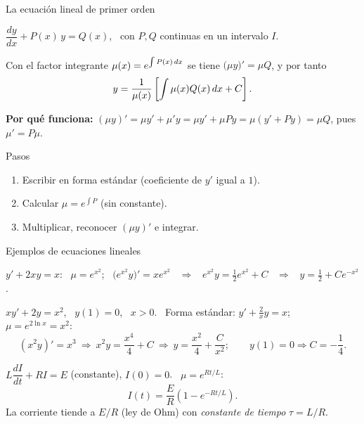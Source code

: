 \documentclass[10pt,aspectratio=169]{beamer}
\begin{document}
\begin{frame}{La ecuación lineal de primer orden}
  \begin{definicion}
    $\dfrac{dy}{dx}+P(x)\,y=Q(x)$, \ con $P,Q$ continuas en un intervalo $I$.
  \end{definicion}
  \begin{teorema}
    Con el factor integrante $\mu(x)=e^{\int P(x)\,dx}$ se tiene $\big(\mu y\big)'=\mu Q$, y por tanto
    \[ y=\frac{1}{\mu(x)}\left[\int\mu(x)Q(x)\,dx+C\right]. \]
  \end{teorema}
  \textbf{Por qué funciona:} $(\mu y)'=\mu y'+\mu'y=\mu y'+\mu Py=\mu(y'+Py)=\mu Q$, pues $\mu'=P\mu$.
  \begin{block}{Pasos}
    \begin{enumerate}
      \item Escribir en forma estándar (coeficiente de $y'$ igual a $1$).
      \item Calcular $\mu=e^{\int P}$ (sin constante).
      \item Multiplicar, reconocer $(\mu y)'$ e integrar.
    \end{enumerate}
  \end{block}
\end{frame}

\begin{frame}{Ejemplos de ecuaciones lineales}
  \begin{ejemplo}[2]
    $y'+2xy=x$: \ $\mu=e^{x^2}$; \ $\big(e^{x^2}y\big)'=xe^{x^2}$ \ $\Rightarrow$ \ $e^{x^2}y=\tfrac12e^{x^2}+C$ \ $\Rightarrow$ \ $y=\tfrac12+Ce^{-x^2}$.
  \end{ejemplo}
  \begin{ejemplo}[3: PVI]
    $xy'+2y=x^2$, \ $y(1)=0$, \ $x>0$. \ Forma estándar: $y'+\frac2xy=x$; \ $\mu=e^{2\ln x}=x^2$:
    \[ (x^2y)'=x^3\ \Rightarrow\ x^2y=\frac{x^4}4+C\ \Rightarrow\ y=\frac{x^2}4+\frac C{x^2};\qquad y(1)=0\Rightarrow C=-\frac14. \]
  \end{ejemplo}
  \begin{ejemplo}[4: circuito RL]
    $L\dfrac{dI}{dt}+RI=E$ (constante), $I(0)=0$. \ $\mu=e^{Rt/L}$:
    \[ I(t)=\frac ER\left(1-e^{-Rt/L}\right). \]
    La corriente tiende a $E/R$ (ley de Ohm) con \emph{constante de tiempo} $\tau=L/R$.
  \end{ejemplo}
\end{frame}
\end{document}

